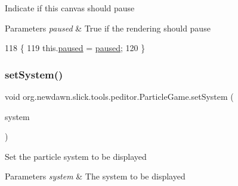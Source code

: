 Indicate if this canvas should pause


\begin{DoxyParams}{Parameters}
{\em paused} & True if the rendering should pause \\
\hline
\end{DoxyParams}

\begin{DoxyCode}
118                                           \{
119         this.\mbox{\hyperlink{classorg_1_1newdawn_1_1slick_1_1tools_1_1peditor_1_1_particle_game_a5023ac0e8141513700ff26420c592211}{paused}} = \mbox{\hyperlink{classorg_1_1newdawn_1_1slick_1_1tools_1_1peditor_1_1_particle_game_a5023ac0e8141513700ff26420c592211}{paused}};
120     \}
\end{DoxyCode}
\mbox{\label{classorg_1_1newdawn_1_1slick_1_1tools_1_1peditor_1_1_particle_game_af5abd2643e2206a84401965789da9ca2}} 
\subsubsection{\texorpdfstring{set\+System()}{setSystem()}}
{\footnotesize\ttfamily void org.\+newdawn.\+slick.\+tools.\+peditor.\+Particle\+Game.\+set\+System (\begin{DoxyParamCaption}\item[{\mbox{\hyperlink{classorg_1_1newdawn_1_1slick_1_1particles_1_1_particle_system}{Particle\+System}}}]{system }\end{DoxyParamCaption})\hspace{0.3cm}{\ttfamily [inline]}}

Set the particle system to be displayed


\begin{DoxyParams}{Parameters}
{\em system} & The system to be displayed \\
\hline
\end{DoxyParams}

